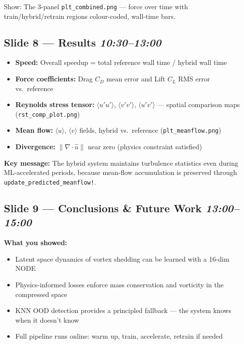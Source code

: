 \documentclass[11pt, a4paper]{article}
\begin{document}
Show: The 3-panel \texttt{plt\_combined.png} --- force over time with
train/hybrid/retrain regions colour-coded, wall-time bars.

\subsection*{Slide 8 --- Results \hfill \normalfont\textit{10:30--13:00}}

\begin{itemize}
  \item \textbf{Speed:} Overall speedup = total reference wall time / hybrid wall time
  \item \textbf{Force coefficients:} Drag $C_D$ mean error and Lift $C_L$ RMS error vs.\ reference
  \item \textbf{Reynolds stress tensor:} $\langle u'u'\rangle$, $\langle v'v'\rangle$,
        $\langle u'v'\rangle$ --- spatial comparison maps (\texttt{rst\_comp\_plot.png})
  \item \textbf{Mean flow:} $\langle u\rangle$, $\langle v\rangle$ fields, hybrid vs.\ reference
        (\texttt{plt\_meanflow.png})
  \item \textbf{Divergence:} $\|\nabla\cdot\hat{u}\|$ near zero (physics constraint satisfied)
\end{itemize}

\textbf{Key message:} The hybrid system maintains turbulence statistics even during
ML-accelerated periods, because mean-flow accumulation is preserved through
\texttt{update\_predicted\_meanflow!}.

\subsection*{Slide 9 --- Conclusions \& Future Work \hfill \normalfont\textit{13:00--15:00}}

\textbf{What you showed:}
\begin{itemize}[noitemsep]
  \item Latent space dynamics of vortex shedding can be learned with a 16-dim NODE
  \item Physics-informed losses enforce mass conservation and vorticity in the compressed space
  \item KNN OOD detection provides a principled fallback --- the system knows when it doesn't know
  \item Full pipeline runs online: warm up, train, accelerate, retrain if needed
\end{itemize}
\end{document}
